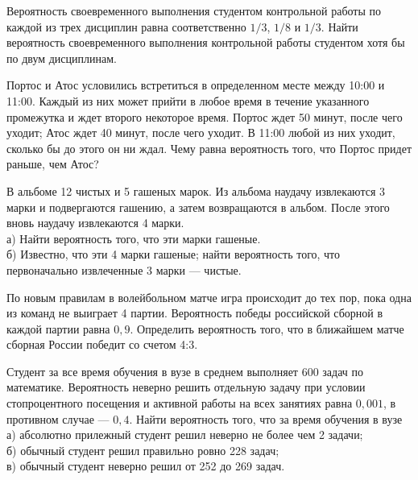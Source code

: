 \newpage\setcounter{zad}{0}



\begin{zkrW}{20}\noindent 
	Вероятность своевременного выполнения студентом контрольной работы по каждой из трех дисциплин равна соответственно $1/3$, $1/8$ и $1/3$. Найти вероятность своевременного выполнения контрольной работы студентом хотя бы по двум дисциплинам.
 
\end{zkrW}

\begin{zkrW}{20}\noindent 
	Портос и Атос условились встретиться в определенном месте между 10:00 и 11:00. Каждый из них может прийти в любое время в течение указанного промежутка и ждет второго некоторое время. Портос ждет 50 минут, после чего уходит; Атос ждет 40 минут, после чего уходит. В 11:00 любой из них уходит, сколько бы до этого он ни ждал. Чему равна вероятность того, что Портос придет раньше, чем Атос?
 
\end{zkrW}

\begin{zkrW}{20}\noindent 
	В альбоме 12 чистых и 5 гашеных марок. Из альбома наудачу извлекаются 3 марки и подвергаются гашению, а затем возвращаются в альбом. После этого вновь наудачу извлекаются 4 марки. \\ \indent а) Найти вероятность того, что эти марки гашеные. \\ \indent б) Известно, что эти 4 марки гашеные; найти вероятность того, что первоначально извлеченные 3 марки --- чистые.
 
\end{zkrW}

\begin{zkrW}{20}\noindent 
	По новым правилам в волейбольном матче игра происходит до тех пор, пока одна из команд не выиграет 4 партии. Вероятность победы российской сборной в каждой партии равна $0{,}9$. Определить вероятность того, что в ближайшем матче сборная России победит со счетом 4:3.
 
\end{zkrW}

\begin{zkrW}{20}\noindent 
	Студент за все время обучения в вузе в среднем выполняет 600 задач по математике. Вероятность неверно решить отдельную задачу при условии стопроцентного посещения и активной работы на всех занятиях равна $0{,}001$, в противном случае --- $0{,}4$. Найти вероятность того, что за время обучения в вузе \\ \indent а) абсолютно прилежный студент решил неверно не более чем 2 задачи; \\ \indent б) обычный студент решил правильно ровно 228 задач; \\ \indent в) обычный студент неверно решил от 252 до 269 задач.
 
\end{zkrW}

